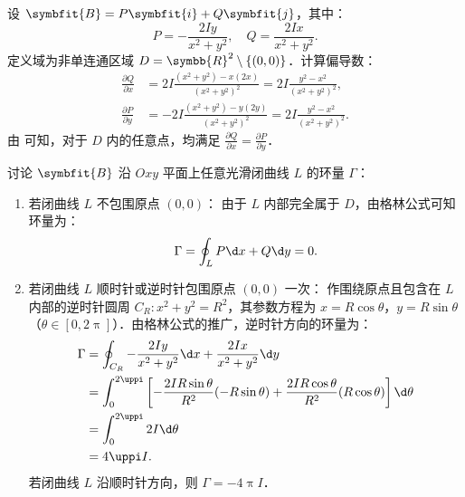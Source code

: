\begin{solution}
    设 $\symbfit{B} = P\symbfit{i} + Q\symbfit{j}$，其中：
    \begin{equation}
        P = -\frac{2Iy}{x^2+y^2}, \quad Q = \frac{2Ix}{x^2+y^2}.
    \end{equation}
    定义域为非单连通区域 $D = \symbb{R}^2 \setminus \{(0,0)\}$．计算偏导数：
    \begin{equation}
        \label{eq:deriv-check}
        \begin{aligned}
            \frac{\partial Q}{\partial x} & = 2I \frac{(x^2+y^2) - x(2x)}{(x^2+y^2)^2} = 2I \frac{y^2-x^2}{(x^2+y^2)^2},  \\
            \frac{\partial P}{\partial y} & = -2I \frac{(x^2+y^2) - y(2y)}{(x^2+y^2)^2} = 2I \frac{y^2-x^2}{(x^2+y^2)^2}.
        \end{aligned}
    \end{equation}
    由  可知，对于 $D$ 内的任意点，均满足 $\frac{\partial Q}{\partial x} = \frac{\partial P}{\partial y}$．

    讨论 $\symbfit{B}$ 沿 $Oxy$ 平面上任意光滑闭曲线 $L$ 的环量 $\Gamma$：
    \begin{enumerate}
        \item 若闭曲线 $L$ 不包围原点 $(0,0)$：
              由于 $L$ 内部完全属于 $D$，由格林公式可知环量为：
              \begin{equation}
                  \Gamma = \oint_L P \d x + Q \d y = 0.
              \end{equation}

        \item 若闭曲线 $L$ 顺时针或逆时针包围原点 $(0,0)$ 一次：
              作围绕原点且包含在 $L$ 内部的逆时针圆周 $C_R: x^2 + y^2 = R^2$，其参数方程为 $x = R\cos\theta$，$y = R\sin\theta$（$\theta \in [0, 2\uppi]$）．由格林公式的推广，逆时针方向的环量为：
              \begin{equation}
                  \begin{aligned}
                      \Gamma & = \oint_{C_R} -\frac{2Iy}{x^2+y^2} \d x + \frac{2Ix}{x^2+y^2} \d y                                                            \\
                             & = \int_0^{2\uppi} \left[ -\frac{2IR\sin\theta}{R^2} (-R\sin\theta) + \frac{2IR\cos\theta}{R^2} (R\cos\theta) \right] \d\theta \\
                             & = \int_0^{2\uppi} 2I \d\theta                                                                                                 \\
                             & = 4\uppi I.
                  \end{aligned}
              \end{equation}
              若闭曲线 $L$ 沿顺时针方向，则 $\Gamma = -4\uppi I$．


\end{enumerate}
\end{solution}
